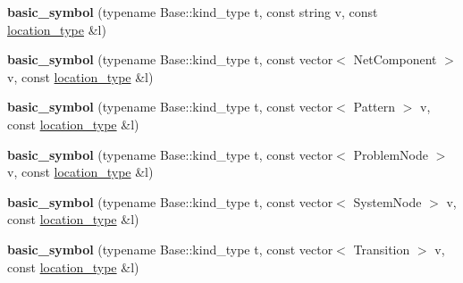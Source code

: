 \begin{DoxyCompactItemize}
\item 
{\bfseries basic\+\_\+symbol} (typename Base\+::kind\+\_\+type t, const string v, const \hyperlink{classyy_1_1spec__parser_aeb5b1e66f65306eca737db5dfa61590d}{location\+\_\+type} \&l)\hypertarget{structyy_1_1spec__parser_1_1basic__symbol_a9df54437bc7bfafb6d69c20e62dd1c6a}{}\label{structyy_1_1spec__parser_1_1basic__symbol_a9df54437bc7bfafb6d69c20e62dd1c6a}

\item 
{\bfseries basic\+\_\+symbol} (typename Base\+::kind\+\_\+type t, const vector$<$ Net\+Component $>$ v, const \hyperlink{classyy_1_1spec__parser_aeb5b1e66f65306eca737db5dfa61590d}{location\+\_\+type} \&l)\hypertarget{structyy_1_1spec__parser_1_1basic__symbol_a7a13f66b965fdc83654d82161b99a643}{}\label{structyy_1_1spec__parser_1_1basic__symbol_a7a13f66b965fdc83654d82161b99a643}

\item 
{\bfseries basic\+\_\+symbol} (typename Base\+::kind\+\_\+type t, const vector$<$ Pattern $>$ v, const \hyperlink{classyy_1_1spec__parser_aeb5b1e66f65306eca737db5dfa61590d}{location\+\_\+type} \&l)\hypertarget{structyy_1_1spec__parser_1_1basic__symbol_ab3ebf0b8cba2bea3868eb2fb530e927a}{}\label{structyy_1_1spec__parser_1_1basic__symbol_ab3ebf0b8cba2bea3868eb2fb530e927a}

\item 
{\bfseries basic\+\_\+symbol} (typename Base\+::kind\+\_\+type t, const vector$<$ Problem\+Node $>$ v, const \hyperlink{classyy_1_1spec__parser_aeb5b1e66f65306eca737db5dfa61590d}{location\+\_\+type} \&l)\hypertarget{structyy_1_1spec__parser_1_1basic__symbol_a1c3ab6125e794ed1e33b53466c801c15}{}\label{structyy_1_1spec__parser_1_1basic__symbol_a1c3ab6125e794ed1e33b53466c801c15}

\item 
{\bfseries basic\+\_\+symbol} (typename Base\+::kind\+\_\+type t, const vector$<$ System\+Node $>$ v, const \hyperlink{classyy_1_1spec__parser_aeb5b1e66f65306eca737db5dfa61590d}{location\+\_\+type} \&l)\hypertarget{structyy_1_1spec__parser_1_1basic__symbol_a33f7dcbf64023eef18c682ad6cd56eed}{}\label{structyy_1_1spec__parser_1_1basic__symbol_a33f7dcbf64023eef18c682ad6cd56eed}

\item 
{\bfseries basic\+\_\+symbol} (typename Base\+::kind\+\_\+type t, const vector$<$ Transition $>$ v, const \hyperlink{classyy_1_1spec__parser_aeb5b1e66f65306eca737db5dfa61590d}{location\+\_\+type} \&l)\hypertarget{structyy_1_1spec__parser_1_1basic__symbol_a93359d85dca05326f134bd3d6aba6ae3}{}\label{structyy_1_1spec__parser_1_1basic__symbol_a93359d85dca05326f134bd3d6aba6ae3}


\end{DoxyCompactItemize}
